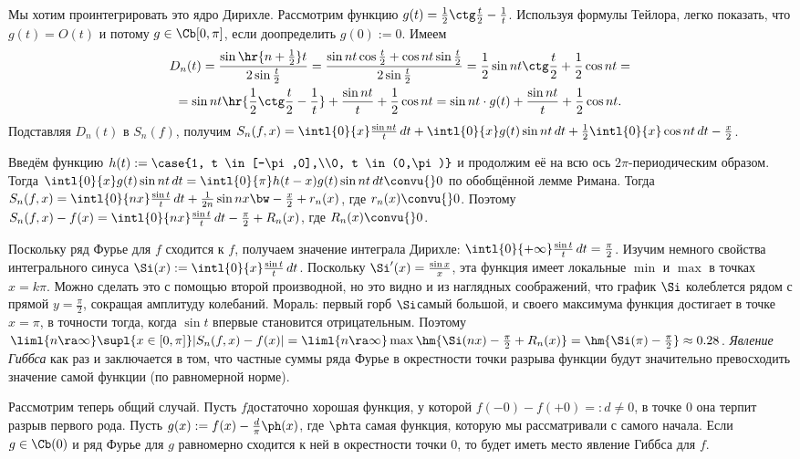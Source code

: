 \documentclass[a4paper]{article}
\newcommand{\intlop}{\intl{0}{\pi}}
\newcommand{\intlox}{\intl{0}{x}}
\begin{document}
Мы хотим проинтегрировать это ядро Дирихле. Рассмотрим функцию $g(t) = \frac{1}{2}\ctg \frac{t}{2} - \frac{1}{t}$. Используя формулы Тейлора,
легко показать, что $g(t) = O(t)$ и потому $g \in\Cb[0,\pi]$, если доопределить $g(0) := 0$. Имеем
\begin{multline*}
D_n(t)=\frac{\sin\hr{n+\frac{1}{2}}t}{2\sin\frac{t}{2}} =
\frac{\sin nt \cos \frac{t}{2} + \cos nt \sin \frac{t}{2}}{2\sin\frac{t}{2}}=
\frac{1}{2}\sin nt \ctg \frac{t}{2} + \frac{1}{2}\cos nt =\\=
\sin nt \hr{\frac{1}{2}\ctg \frac{t}{2}-\frac{1}{t}} +\frac{\sin nt}{t} + \frac{1}{2}\cos nt=
\sin nt \cdot g(t) + \frac{\sin nt}{t} + \frac{1}{2}\cos nt.
\end{multline*}
Подставляя $D_n(t)$ в $S_n(f)$, получим $S_n(f,x) = \intlox \frac{\sin nt}{t}\,d t + \intlox
g(t)\sin nt \,d t + \frac{1}{2}\intlox \cos nt \,d t -\frac{x}{2}$.

Введём функцию $h(t) := \case{1, t \in [-\pi,0],\\0, t \in (0,\pi)}$ и продолжим её на всю ось
$2\pi$-периодическим образом. Тогда $\intlox g(t)\sin nt \,d t = \intlop h(t-x)g(t)\sin nt \,d t
\convu{} 0$ по обобщённой лемме Римана. Тогда $S_n(f,x) = \intl{0}{nx}\frac{\sin t}{t}\,d t +
\frac{1}{2n}\sin nx \bw- \frac x2 + r_n(x)$, где $r_n(x)\convu{}0$. Поэтому $S_n(f,x) - f(x) =
\intl{0}{nx}\frac{\sin t}{t}\,d t - \frac{\pi}{2} + R_n(x)$, где $R_n(x)\convu{}0$.

Поскольку ряд Фурье для $f$ сходится к $f$, получаем значение интеграла Дирихле:
$\intl{0}{+\infty}\frac{\sin t}{t}\,d t =\frac{\pi}{2}$. Изучим немного свойства интегрального
синуса $\Si(x) := \intlox\frac{\sin t}{t}\,d t$. Поскольку $\Si'(x) = \frac{\sin x}{x}$, эта
функция имеет локальные $\min$ и $\max$ в точках $x = k\pi$. Можно сделать это с помощью второй
производной, но это видно и из наглядных соображений, что график $\Si$ колеблется рядом с прямой $y
= \frac{\pi}{2}$, сокращая амплитуду колебаний. Мораль: первый горб $\Si$\т самый большой, и
своего максимума функция достигает в точке $x=\pi$,  в точности тогда, когда $\sin t$ впервые
становится отрицательным. Поэтому $\liml{n\ra\infty}\supl{x\in[0,\pi]}|S_n(f,x) - f(x)| =
\liml{n\ra\infty} \max \hm{\Si(nx) - \frac{\pi}{2} + R_n(x)} = \hm{\Si(\pi)-\frac{\pi}{2}} \approx
0.28$. \emph{Явление Гиббса} как раз и заключается в том, что частные суммы ряда Фурье в окрестности точки
разрыва функции будут значительно превосходить значение самой функции (по равномерной норме).

Рассмотрим теперь общий случай. Пусть $f$\т достаточно хорошая функция, у которой $f(-0) - f(+0) =: d \neq 0$,  в точке $0$ она
терпит разрыв первого рода. Пусть $g(x) := f(x) - \frac{d}{\pi}\ph(x)$, где $\ph$\т та самая функция, которую мы рассматривали с самого начала.
Если $g \in\Cb(0)$ и ряд Фурье для $g$ равномерно сходится к ней в окрестности точки 0, то будет иметь место явление Гиббса для $f$.
\end{document}
